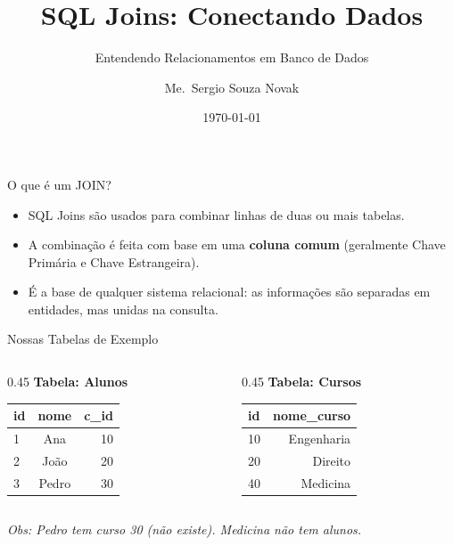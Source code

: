 \documentclass[10pt]{beamer}
\title{SQL Joins: Conectando Dados}
\subtitle{Entendendo Relacionamentos em Banco de Dados}
\author{Me.~Sergio Souza Novak}
\date{\today}
\begin{document}
\begin{frame}
    \titlepage
\end{frame}

\begin{frame}{O que é um JOIN?}
    \begin{itemize}
        \item SQL Joins são usados para combinar linhas de duas ou mais tabelas.
        \item A combinação é feita com base em uma \textbf{coluna comum} (geralmente Chave Primária e Chave Estrangeira).
        \item É a base de qualquer sistema relacional: as informações são separadas em entidades, mas unidas na consulta.
    \end{itemize}
\end{frame}

\begin{frame}{Nossas Tabelas de Exemplo}
    \begin{columns}
        \begin{column}{0.45\textwidth}
            \textbf{Tabela: Alunos}
            \small
            \begin{table}
                \begin{tabular}{lcr}
                \toprule
                \textbf{id} & \textbf{nome} & \textbf{c\_id} \\ \midrule
                1 & Ana & 10 \\
                2 & João & 20 \\
                3 & \alert{Pedro} & \alert{30} \\ \bottomrule
                \end{tabular}
            \end{table}
        \end{column}
        \begin{column}{0.45\textwidth}
            \textbf{Tabela: Cursos}
            \small
            \begin{table}
                \begin{tabular}{lr}
                \toprule
                \textbf{id} & \textbf{nome\_curso} \\ \midrule
                10 & Engenharia \\
                20 & Direito \\
                \alert{40} & \alert{Medicina} \\ \bottomrule
                \end{tabular}
            \end{table}
        \end{column}
    \end{columns}
    \vspace{0.5em}
    \centering
    \footnotesize \textit{Obs: Pedro tem curso 30 (não existe). Medicina não tem alunos.}
\end{frame}
\end{document}
